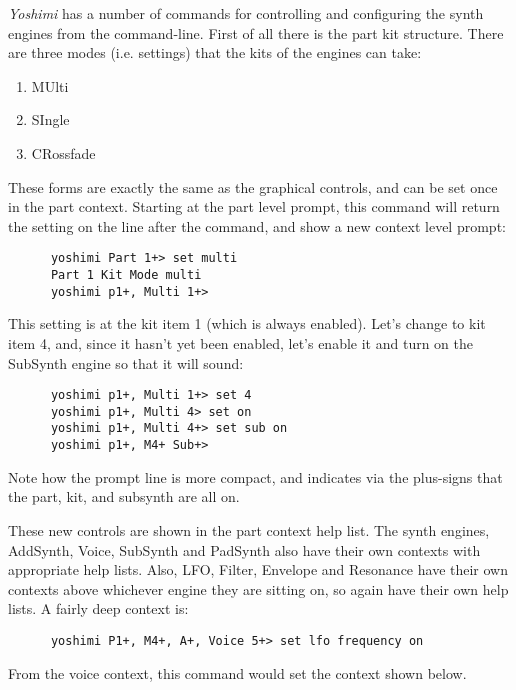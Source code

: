    \textsl{Yoshimi} has a number of commands for controlling and configuring
   the synth engines from the command-line. First of all there is the part
   kit structure.
   There are three modes (i.e. settings) that the kits of the engines
   can take:

   \begin{enumerate}
      \item MUlti
      \item SIngle
      \item CRossfade
   \end{enumerate}

   These forms are exactly the same as the graphical controls,
   and can be set once in the part context.
   Starting at the part level prompt, this command will return the setting
   on the line after the command, and show a new context level prompt:

   \begin{verbatim}
      yoshimi Part 1+> set multi
      Part 1 Kit Mode multi
      yoshimi p1+, Multi 1+>
   \end{verbatim}

   This setting is at the kit item 1 (which is always enabled).
   Let's change to kit item 4, and, since it hasn't yet been enabled,
   let's enable it and turn on the
   SubSynth engine so that it will sound:

   \begin{verbatim}
      yoshimi p1+, Multi 1+> set 4
      yoshimi p1+, Multi 4> set on
      yoshimi p1+, Multi 4+> set sub on
      yoshimi p1+, M4+ Sub+>
   \end{verbatim}

   Note how the prompt line is more compact, and indicates via the
   plus-signs that the part, kit, and subsynth are all on.

   These new controls are shown in the part context help list.
   The synth engines, AddSynth, Voice, SubSynth and PadSynth also have
   their own contexts with appropriate help lists.
   Also, LFO, Filter, Envelope and Resonance have their own contexts
   above whichever engine they are sitting on, so again have their own
   help lists.
   A fairly deep context is:

   \begin{verbatim}
      yoshimi P1+, M4+, A+, Voice 5+> set lfo frequency on
   \end{verbatim}

   From the voice context, this command would set the context shown below.


